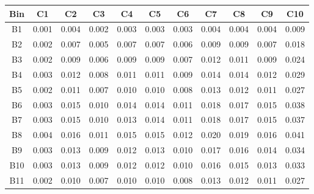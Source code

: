 \begin{tabular}{c@{~~~}c@{~~}c@{~~}c@{~~}c@{~~}c@{~~}c@{~~}c@{~~}c@{~~}c@{~~}c}
\hline
 \hline
Bin	& C1 & C2 & C3 & C4 & C5 & C6 & C7 & C8 & C9 & C10 \\
\hline
B1	&  0.001 &  0.004 &  0.002 &  0.003 &  0.003 &  0.003 &  0.004 &  0.004 &  0.004 &  0.009 \\
B2	&  0.002 &  0.007 &  0.005 &  0.007 &  0.007 &  0.006 &  0.009 &  0.009 &  0.007 &  0.018 \\
B3	&  0.002 &  0.009 &  0.006 &  0.009 &  0.009 &  0.007 &  0.012 &  0.011 &  0.009 &  0.024 \\
B4	&  0.003 &  0.012 &  0.008 &  0.011 &  0.011 &  0.009 &  0.014 &  0.014 &  0.012 &  0.029 \\
B5	&  0.002 &  0.011 &  0.007 &  0.010 &  0.010 &  0.008 &  0.013 &  0.012 &  0.011 &  0.027 \\
B6	&  0.003 &  0.015 &  0.010 &  0.014 &  0.014 &  0.011 &  0.018 &  0.017 &  0.015 &  0.038 \\
B7	&  0.003 &  0.015 &  0.010 &  0.013 &  0.014 &  0.011 &  0.018 &  0.017 &  0.015 &  0.037 \\
B8	&  0.004 &  0.016 &  0.011 &  0.015 &  0.015 &  0.012 &  0.020 &  0.019 &  0.016 &  0.041 \\
B9	&  0.003 &  0.013 &  0.009 &  0.012 &  0.013 &  0.010 &  0.017 &  0.016 &  0.014 &  0.034 \\
B10	&  0.003 &  0.013 &  0.009 &  0.012 &  0.012 &  0.010 &  0.016 &  0.015 &  0.013 &  0.033 \\
B11	&  0.002 &  0.010 &  0.007 &  0.010 &  0.010 &  0.008 &  0.013 &  0.012 &  0.011 &  0.027 \\
\hline
 \hline
\end{tabular}

